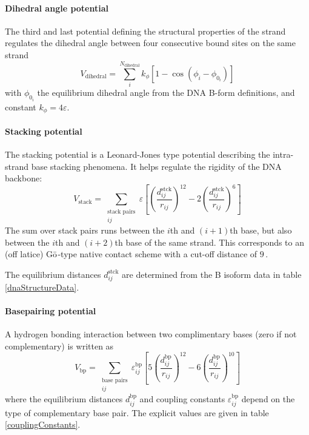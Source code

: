 \paragraph{Dihedral angle potential} The third and last potential defining the structural properties of the strand regulates the dihedral angle between four consecutive bound sites on the same strand
\begin{equation}
V_\text{dihedral} =  \sum_i^{N_\text{dihedral}} k_\phi \left[ 1 - \cos (\phi_i - \phi_{0_i}) \right]
\end{equation}
with $\phi_{0_i}$ the equilibrium dihedral angle from the DNA B-form definitions, and constant $k_\phi = 4\varepsilon$.

\paragraph{Stacking potential} The stacking potential is a Leonard-Jones type potential describing the intra-strand base stacking phenomena. It helps regulate the rigidity of the DNA backbone:
\begin{equation}
V_\text{stack}
=  \sum_{\substack{\text{stack pairs}\\ij}}
\varepsilon \left[ \left(\frac{d^\text{stck}_{ij}}{r_{ij}} \right)^{12} - 2\left(\frac{d_{ij}^\text{stck}}{r_{ij}} \right)^{6} \right]
\end{equation}
The sum over stack pairs runs between the $i$th and $(i+1)$th base, but also between the $i$th and $(i+2)$th base of the same strand.
This corresponds to an (off latice) G$\bar{\text o}$-type native contact scheme\cite{hoangcieplak, cieplak2003folding} with a cut-off distance of $9$\,\Angstrom.

The equilibrium distances $d_{ij}^\text{stck}$ are determined from the B isoform data in table \ref{dnaStructureData}.


\paragraph{Basepairing potential} A hydrogen bonding interaction between two complimentary bases (zero if not complementary) is written as
\begin{equation}
V_\text{bp}
= \sum_{\substack{\text{base pairs}\\ ij}} \varepsilon^\text{bp}_{ij} \left[
	5\left(\frac{d_{ij}^\text{bp}}{r_{ij}} \right)^{12}
	- 6\left(\frac{d_{ij}^\text{bp}}{r_{ij}} \right)^{10} \right]
\end{equation}
where the equilibrium distances $d^\text{bp}_{ij}$ and coupling constants $\varepsilon^\text{bp}_{ij}$ depend on the type of complementary base pair. The explicit values are given in table \ref{couplingConstants}.

